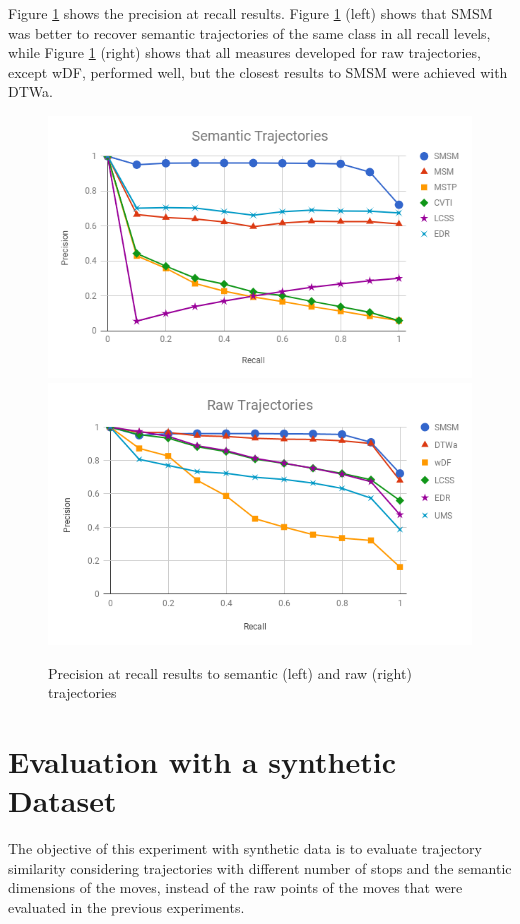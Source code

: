 {Figure {\ref{fig:geolife_precision_recall}} shows the precision at recall results. Figure {\ref{fig:geolife_precision_recall}} (left) shows that SMSM was better to recover semantic trajectories of the same class in all recall levels, while Figure {\ref{fig:geolife_precision_recall}} (right) shows that all measures developed for raw trajectories, except wDF, performed well, but  the closest results to SMSM were achieved with DTWa.}


\begin{figure}[ht!]
\centerline{
\centering
\includegraphics[width=.55\textwidth]{Images/new_P_R-chart_Geolife.png}
\includegraphics[width=.55\textwidth]{Images/new_P_R-chart_Geolife-raw.png}
}
\caption{Precision at recall results to semantic (left) and raw (right) trajectories}
\label{fig:geolife_precision_recall}
\end{figure}

\section{Evaluation with a synthetic Dataset}\label{sec:hermoupolis}
The objective of this experiment with synthetic data is to evaluate trajectory similarity considering trajectories with different number of stops and the semantic dimensions of the moves, instead of the raw points of the moves that were evaluated in the previous experiments.

